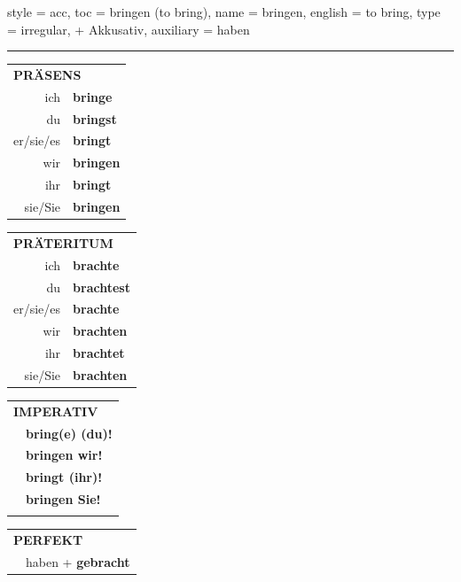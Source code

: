 \begin{verbentry}{
  style = {acc},
  toc = {bringen (to bring)},
  name = {bringen},
  english = {to bring},
  type = {irregular, + Akkusativ},
  auxiliary = {haben}
}
 
    
     \vspace{5pt}

    \hrule
    
    \vspace{5pt}

  \begin{tabular}{rl}
     \multicolumn{2}{l}{\textbf{PRÄSENS} }\\
    ich & \textbf{bringe}\\
    du & \textbf{bringst}\\
    er/sie/es & \textbf{bringt}\\
    wir & \textbf{bringen}\\
    ihr & \textbf{bringt}\\
    sie/Sie & \textbf{bringen}\\
  \end{tabular}
  \hfill
     \begin{tabular}{rl}
    \multicolumn{2}{l}{\textbf{PRÄTERITUM} }\\
    ich & \textbf{brachte}\\
    du & \textbf{brachtest}\\
    er/sie/es & \textbf{brachte}\\
    wir & \textbf{brachten}\\
    ihr & \textbf{brachtet}\\
    sie/Sie & \textbf{brachten}\\
  \end{tabular}
  \hfill
  \begin{tabular}{rl}
     \multicolumn{2}{l}{\textbf{IMPERATIV} }\\
   & \textbf{bring(e) (du)!}\\
   & \textbf{bringen wir!}\\
   & \textbf{bringt (ihr)!}\\
   & \textbf{bringen Sie!}\\
   & \vspace{10pt}
  \end{tabular}

    \vspace{10pt}

 \begin{tabular}{rl}
     \multicolumn{2}{l}{\textbf{PERFEKT}}\\
 &   haben + \textbf{gebracht}\\
  \end{tabular}
\hfill
   \begin{tabular}{rl}
   

\end{tabular}
\end{verbentry}
